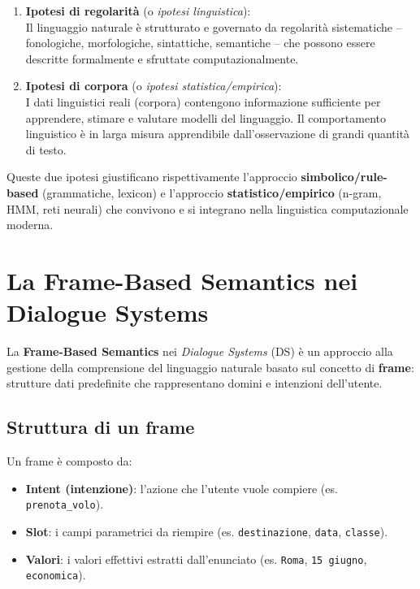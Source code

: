 \documentclass[12pt,a4paper]{article}
\begin{document}
\begin{defbox}
\begin{enumerate}[leftmargin=1.5em, label=\textbf{\Roman*.}]
  \item \textbf{Ipotesi di regolarità} (o \emph{ipotesi linguistica}): \\
    Il linguaggio naturale è strutturato e governato da regolarità sistematiche -- fonologiche, morfologiche, sintattiche, semantiche -- che possono essere descritte formalmente e sfruttate computazionalmente.

  \item \textbf{Ipotesi di corpora} (o \emph{ipotesi statistica/empirica}): \\
    I dati linguistici reali (corpora) contengono informazione sufficiente per apprendere, stimare e valutare modelli del linguaggio. Il comportamento linguistico è in larga misura apprendibile dall'osservazione di grandi quantità di testo.
\end{enumerate}
\end{defbox}

Queste due ipotesi giustificano rispettivamente l'approccio \textbf{simbolico/rule-based} (grammatiche, lexicon) e l'approccio \textbf{statistico/empirico} (n-gram, HMM, reti neurali) che convivono e si integrano nella linguistica computazionale moderna.

\section{La Frame-Based Semantics nei Dialogue Systems}

La \textbf{Frame-Based Semantics} nei \emph{Dialogue Systems} (DS) è un approccio alla gestione della comprensione del linguaggio naturale basato sul concetto di \textbf{frame}: strutture dati predefinite che rappresentano domini e intenzioni dell'utente.

\subsection{Struttura di un frame}
Un frame è composto da:
\begin{defbox}
\begin{itemize}[leftmargin=1.5em]
  \item \textbf{Intent (intenzione)}: l'azione che l'utente vuole compiere (es. \texttt{prenota\_volo}).
  \item \textbf{Slot}: i campi parametrici da riempire (es. \texttt{destinazione}, \texttt{data}, \texttt{classe}).
  \item \textbf{Valori}: i valori effettivi estratti dall'enunciato (es. \texttt{Roma}, \texttt{15 giugno}, \texttt{economica}).
\end{itemize}
\end{defbox}
\end{document}
